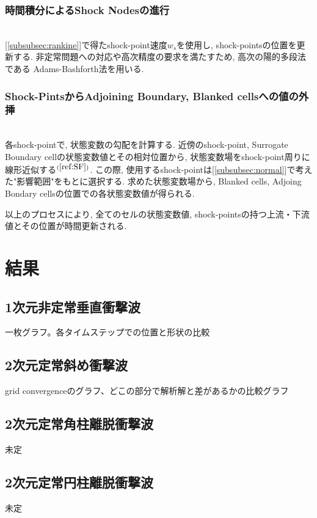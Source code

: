 \documentclass[a4j]{jarticle}
\begin{document}
\subsubsection{時間積分によるShock Nodesの進行} \label{subsubsec:prop}
\mbox{}\\[-1.0ex]

[\ref{subsubsec:rankine}]で得たshock-point速度$w_s$を使用し, shock-pointsの位置を更新する.
非定常問題への対応や高次精度の要求を満たすため, 高次の陽的多段法である
Adams-Bashforth法を用いる.

\subsubsection{Shock-PintsからAdjoining Boundary, Blanked cellsへの値の外挿} \label{subsubsec:adjoining}
\mbox{}\\[-1.0ex]

各shock-pointで, 状態変数の勾配を計算する.
近傍のshock-point, Surrogate Boundary cellの状態変数値とその相対位置から, 
状態変数場をshock-point周りに線形近似する$^{(\ref{ref:SF})}$.
この際, 使用するshock-pointは[\ref{subsubsec:normal}]で考えた"影響範囲"をもとに選択する.
求めた状態変数場から, Blanked cells, Adjoing Bondary cellsの位置での各状態変数値が得られる.

以上のプロセスにより, 全てのセルの状態変数値, shock-pointsの持つ上流・下流値とその位置が時間更新される.

\section{結果}
\subsection{1次元非定常垂直衝撃波}
一枚グラフ。各タイムステップでの位置と形状の比較

\subsection{2次元定常斜め衝撃波}
grid convergenceのグラフ、どこの部分で解析解と差があるかの比較グラフ

\subsection{2次元定常角柱離脱衝撃波}
未定

\subsection{2次元定常円柱離脱衝撃波}
未定
\end{document}

